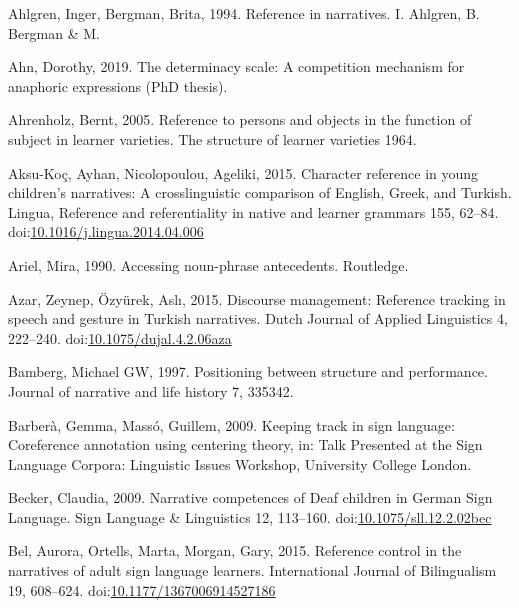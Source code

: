 \documentclass[]{elsarticle} %
\newlength{\cslhangindent}
\newenvironment{CSLReferences}[2] %
 {%
  \setlength{\parindent}{0pt}
  \ifodd #1 \everypar{\setlength{\hangindent}{\cslhangindent}}\ignorespaces\fi
  \ifnum #2 > 0
  \setlength{\parskip}{#2\baselineskip}
  \fi
 }%
 {}
\begin{document}
\hypertarget{refs}{}
\begin{CSLReferences}{1}{0}
\leavevmode{}%
Ahlgren, Inger, Bergman, Brita, 1994. Reference in narratives. I.
Ahlgren, B. Bergman \& M.

\leavevmode{}%
Ahn, Dorothy, 2019. The determinacy scale: A competition mechanism for
anaphoric expressions (PhD thesis).

\leavevmode{}%
Ahrenholz, Bernt, 2005. Reference to persons and objects in the function
of subject in learner varieties. The structure of learner varieties
1964.

\leavevmode{}%
Aksu-Koç, Ayhan, Nicolopoulou, Ageliki, 2015. Character reference in
young children's narratives: A crosslinguistic comparison of English,
Greek, and Turkish. Lingua, Reference and referentiality in native and
learner grammars 155, 62--84.
doi:\href{https://doi.org/10.1016/j.lingua.2014.04.006}{10.1016/j.lingua.2014.04.006}

\leavevmode{}%
Ariel, Mira, 1990. Accessing noun-phrase antecedents. Routledge.

\leavevmode{}%
Azar, Zeynep, Özyürek, Aslı, 2015. Discourse management: Reference
tracking in speech and gesture in Turkish narratives. Dutch Journal of
Applied Linguistics 4, 222--240.
doi:\href{https://doi.org/10.1075/dujal.4.2.06aza}{10.1075/dujal.4.2.06aza}

\leavevmode{}%
Bamberg, Michael GW, 1997. Positioning between structure and
performance. Journal of narrative and life history 7, 335342.

\leavevmode{}%
Barberà, Gemma, Massó, Guillem, 2009. Keeping track in sign language:
Coreference annotation using centering theory, in: Talk Presented at the
Sign Language Corpora: Linguistic Issues Workshop, University College
London.

\leavevmode{}%
Becker, Claudia, 2009. Narrative competences of Deaf children in German
Sign Language. Sign Language \& Linguistics 12, 113--160.
doi:\href{https://doi.org/10.1075/sll.12.2.02bec}{10.1075/sll.12.2.02bec}

\leavevmode{}%
Bel, Aurora, Ortells, Marta, Morgan, Gary, 2015. Reference control in
the narratives of adult sign language learners. International Journal of
Bilingualism 19, 608--624.
doi:\href{https://doi.org/10.1177/1367006914527186}{10.1177/1367006914527186}


\end{CSLReferences}
\end{document}
